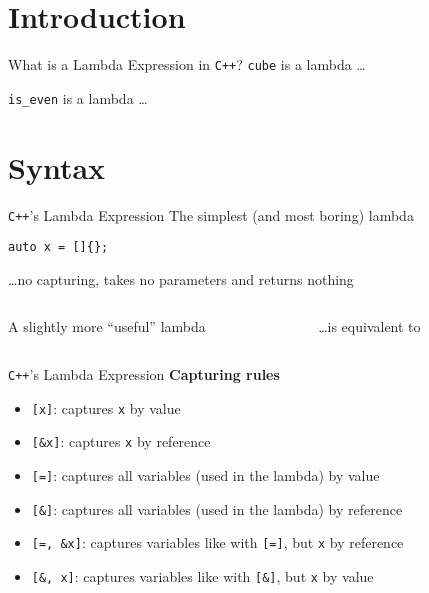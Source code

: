 \begin{frame}
    \centering
    \scalebox{3}{Introduction}
\end{frame}

\section{Introduction}

\begin{frame}[fragile]{What is a Lambda Expression in \texttt{C++}?}
    \texttt{cube} is a lambda \ldots

    \texttt{is\_even} is a lambda \ldots
\end{frame}

\section{Syntax}

\begin{frame}[fragile]{\texttt{C++}'s Lambda Expression}
    The simplest (and most boring) lambda
    \begin{lstlisting}
auto x = []{};
    \end{lstlisting}
    \hfill \ldots no capturing, takes no parameters and returns nothing

    \vspace{5mm}

    \begin{columns}[t]
        \begin{column}{.45\textwidth}
            A slightly more \enquote{useful} lambda
        \end{column}
        \begin{column}{.45\textwidth}
            \ldots is equivalent to
        \end{column}
    \end{columns}
\end{frame}

\begin{frame}[fragile]{\texttt{C++}'s Lambda Expression}
    \textbf{Capturing rules}
    \begin{itemize}
        \item \texttt{[x]}: captures \texttt{x} by value
        \item \texttt{[\&x]}: captures \texttt{x} by reference
        \item \texttt{[=]}: captures all variables (used in the lambda) by value
        \item \texttt{[\&]}: captures all variables (used in the lambda) by reference
        \item \texttt{[=, \&x]}: captures variables like with \texttt{[=]}, but \texttt{x} by reference
        \item \texttt{[\&, x]}: captures variables like with \texttt{[\&]}, but \texttt{x} by value
    \end{itemize}
\end{frame}

